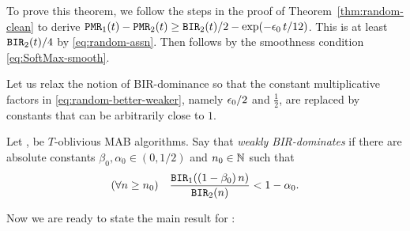 To prove this theorem, we follow the steps in the proof of Theorem~\ref{thm:random-clean} to derive
$\mathtt{PMR}_1(t) - \mathtt{PMR}_2(t)
    \geq \mathtt{BIR}_2(t)/2 -\exp(-\epsilon_0\, t/12)$.
This is at least $\mathtt{BIR}_2(t)/4$ by \eqref{eq:random-assn}. Then  follows by the smoothness condition \eqref{eq:SoftMax-smooth}.


Let us relax the notion of BIR-dominance so that the constant multiplicative factors in \eqref{eq:random-better-weaker}, namely
 $\epsilon_0/2$ and $\tfrac12$, are replaced by constants that can be arbitrarily close to $1$.

\begin{definition}
Let \alg[1],  \alg[2] be $T$-oblivious MAB algorithms. Say that
\alg[1] \emph{weakly BIR-dominates} \alg[2] if there are absolute  constants $\beta_0, \alpha_0\in (0, 1/2)$ and $n_0\in\mathbb{N}$ such that
 \begin{align}\label{eq:SoftMax-better}
   (\forall n\geq n_0) \quad
   \frac{\mathtt{BIR}_1((1-\beta_0)\, n)}{\mathtt{BIR}_2(n)} <1-\alpha_0.
 \end{align}
 \end{definition}


Now we are ready to state the main result for \SoftMaxRandom:

